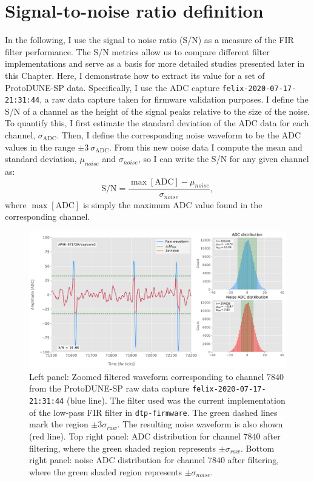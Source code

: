 \section{Signal-to-noise ratio definition}
\label{sec:matched_filter_sn_definition}

In the following, I use the signal to noise ratio (S/N) as a measure of the FIR filter performance. The S/N metrics allow us to compare different filter implementations and serve as a basis for more detailed studies presented later in this Chapter. Here, I demonstrate how to extract its value for a set of 
ProtoDUNE-SP data. Specifically, I use the ADC capture \texttt{felix-2020-07-17-21:31:44}, a raw data capture taken for firmware validation purposes. I define the S/N of a channel as the height of the signal peaks relative to the size of the noise. To quantify this, I first estimate the standard deviation of the ADC data for each channel, $\sigma_{\mathrm{ADC}}$. Then, I define the corresponding noise waveform to be the ADC values in the range $\pm 3~\sigma_{\mathrm{ADC}}$. From this new noise data I compute the mean and standard deviation, $\mu_{noise}$ and $\sigma_{noise}$, so I can write the S/N for any given channel as:
\begin{equation}
	\mathrm{S/N} = \frac{\max{[\mathrm{ADC}]} - \mu_{noise}}{\sigma_{noise}},
\end{equation}
where $\max{[\mathrm{ADC}]}$ is simply the maximum ADC value found in the corresponding channel.

\begin{figure}[t]
	\centering
	\includegraphics[width=1\linewidth]{Images/Matched_Filter/waveform_example_fir}
	\caption[Example filtered waveform from a ProtoDUNE-SP raw data capture.]{Left panel: Zoomed filtered waveform corresponding to channel $7840$ from the ProtoDUNE-SP raw data capture \texttt{felix-2020-07-17-21:31:44} (blue line). The filter used was the current implementation of the low-pass FIR filter in \texttt{dtp-firmware}. The green dashed lines mark the region $\pm3\sigma_{raw}$. The resulting noise waveform is also shown (red line). Top right panel: ADC distribution for channel $7840$ after filtering, where the green shaded region represents $\pm \sigma_{raw}$. Bottom right panel: noise ADC distribution for channel $7840$ after filtering, where the green shaded region represents $\pm \sigma_{noise}$.}
	\label{fig:adcs_fir}
\end{figure}

